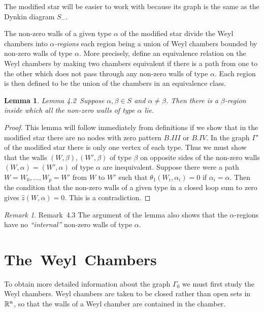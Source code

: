 \documentclass{memo-l}
\newtheorem{lemma}[theorem]{Lemma}
\theoremstyle{definition}
\theoremstyle{remark}
\newtheorem{remark}[theorem]{Remark}
\numberwithin{section}{chapter}
\numberwithin{equation}{chapter}
\begin{document}
The modified star will be easier to work with because its graph is the same
as the Dynkin diagram $S_{-}$.


   The non-zero walls of a given type ${\alpha}$ of the modified star
divide the Weyl chambers into {\it $\alpha$-regions} each region being a
union of Weyl chambers bounded by non-zero walls of type ${\alpha}$.  More
precisely, define an equivalence relation on the Weyl chambers by making
two chambers equivalent if there is a path from one to the other which does
not pass through any non-zero walls of type ${\alpha}$.  Each region is
then defined to be the union of the chambers in an equivalence class.

\medskip

\begin{lemma}{Lemma 4.2}\ Suppose ${\alpha},{\beta}  \in  S$ and
${\alpha}\ne {\beta}$.  Then there is a ${\beta}$-region inside which all
the non-zero walls of type ${\alpha}$ lie.
\end{lemma}

\begin{proof}   This lemma will follow immediately from
definitions if we show that in the modified star there are no nodes with
zero pattern $B.III$ or $B.IV$.  In the graph ${\Gamma}'$ of the modified
star there is only one vertex of each type.  Thus we must show that the
walls $(W,{\beta}), (W',{\beta})$ of type ${\beta}$ on opposite sides of
the non-zero walls $(W,{\alpha}) = (W',{\alpha})$ of type ${\alpha}$ are
inequivalent.  Suppose there were a path $W = W_{0},\ldots ,W_{p} = W'$ from
$W$ to $W'$ such that ${\theta}_{1}(W_{i},{\alpha}_{i}) = 0$ if
${\alpha}_{i} = {\alpha}$.  Then the condition that the non-zero walls of a
given type in a closed loop sum to zero gives $\hat z(W,{\alpha}) = 0$.
This is a contradiction.
\end{proof}


\begin{remark}{Remark\ 4.3} The argument of the lemma also shows that the
${\alpha}$-regions have no {\it ``internal''} non-zero walls of type ${\alpha}$.
\end{remark}




\section{The\ Weyl\ Chambers}

   To obtain more detailed information about the graph ${\Gamma}_{0}$ we
must first study the Weyl chambers.  Weyl chambers are taken to be closed
rather than open sets in ${\Bbb R}^{n}$, so that the walls of a Weyl
chamber are contained in the chamber.
\end{document}
